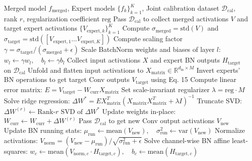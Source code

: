 \documentclass{article}
\theoremstyle{plain}
\theoremstyle{definition}
\theoremstyle{remark}
\begin{document}
\begin{algorithm}[tb]
\caption{Hybrid SP-TAAC + SLR-WBC Sequential Calibration}
\label{alg:hybrid_slr_wbc}
\begin{algorithmic}[1]
 Merged model $f_{\text{merged}}$, Expert models $\{f_k\}_{k=1}^K$, Joint calibration dataset $\mathcal{D}_{\text{cal}}$, rank $r$, regularization coefficient $\text{reg}$
    \STATE Pass $\mathcal{D}_{\text{cal}}$ to collect merged activations $V$ and target expert activations $\{V_{\text{expert}, k}\}_{k=1}^K$
    \STATE Compute $\sigma_{\text{merged}} = \text{std}(V)$ and $\sigma_{\text{target}} = \text{std}([V_{\text{expert}, 1} \dots V_{\text{expert}, K}])$
    \STATE Compute scaling factor $\gamma = \sigma_{\text{target}} / (\sigma_{\text{merged}} + \epsilon)$
    \STATE Scale BatchNorm weights and biases of layer $l$: $w_l \leftarrow \gamma w_l, \quad b_l \leftarrow \gamma b_l$
  \ENDIF
    \STATE Collect input activations $X$ and expert BN outputs $H_{\text{target}}$ on $\mathcal{D}_{\text{cal}}$
    \STATE Unfold and flatten input activations to $X_{\text{matrix}} \in \mathbb{R}^{d_{\text{in}} \times M}$
    \STATE Invert experts' BN operations to get target Conv outputs $V_{\text{target}}$ using Eq. 15
    \STATE Compute linear error matrix: $E = V_{\text{target}} - W_{\text{curr}} X_{\text{matrix}}$
    \STATE Set scale-invariant regularizer $\lambda = \text{reg} \cdot M$
    \STATE Solve ridge regression: $\Delta W^* = E X_{\text{matrix}}^T (X_{\text{matrix}} X_{\text{matrix}}^T + \lambda I)^{-1}$
    \STATE Truncate SVD: $\Delta W^{(r)} \leftarrow \text{Rank-}r\text{ SVD of }\Delta W^*$
    \STATE Update weights in-place: $W_{\text{curr}} \leftarrow W_{\text{curr}} + \Delta W^{(r)}$
    \STATE Pass $\mathcal{D}_{\text{cal}}$ to get new Conv output activations $V_{\text{new}}$
    \STATE Update BN running stats: $\mu_{\text{run}} \leftarrow \text{mean}(V_{\text{new}}), \quad \sigma_{\text{run}}^2 \leftarrow \text{var}(V_{\text{new}})$
    \STATE Normalize activations: $V_{\text{norm}} = (V_{\text{new}} - \mu_{\text{run}}) / \sqrt{\sigma_{\text{run}}^2 + \epsilon}$
    \STATE Solve channel-wise BN affine least-squares:
    \STATE $w_c \leftarrow \text{mean}(V_{\text{norm}, c} \cdot H_{\text{target}, c}), \quad b_c \leftarrow \text{mean}(H_{\text{target}, c})$
  \ENDIF
\ENDFOR
\end{algorithmic}
\end{algorithm}
\end{document}
